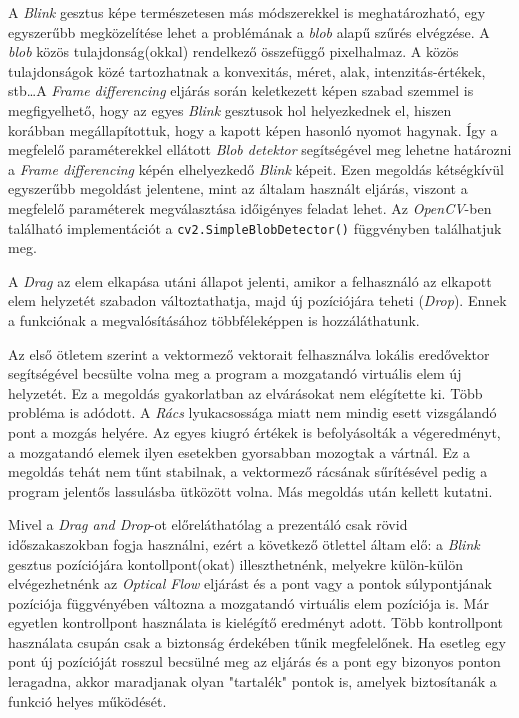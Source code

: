A \textit{Blink} gesztus képe természetesen más módszerekkel is meghatározható, egy egyszerűbb megközelítése lehet a problémának a \textit{blob} alapű szűrés elvégzése. A \textit{blob} közös tulajdonság(okkal) rendelkező összefüggő pixelhalmaz. A közös tulajdonságok közé tartozhatnak a konvexitás, méret, alak, intenzitás-értékek, stb\ldots A \textit{Frame differencing} eljárás során keletkezett képen szabad szemmel is megfigyelhető, hogy az egyes \textit{Blink} gesztusok hol helyezkednek el, hiszen korábban megállapítottuk, hogy a kapott képen hasonló nyomot hagynak. Így a megfelelő paraméterekkel ellátott \textit{Blob detektor} segítségével meg lehetne határozni a \textit{Frame differencing} képén elhelyezkedő \textit{Blink} képeit. Ezen megoldás kétségkívül egyszerűbb megoldást jelentene, mint az általam használt eljárás, viszont a megfelelő paraméterek megválasztása időigényes feladat lehet. Az \textit{OpenCV}-ben található implementációt a \texttt{cv2.SimpleBlobDetector()} függvényben találhatjuk meg.


A \textit{Drag} az elem elkapása utáni állapot jelenti, amikor a felhasználó az elkapott elem helyzetét szabadon változtathatja, majd új pozíciójára teheti (\textit{Drop}). Ennek a funkciónak a megvalósításához többféleképpen is hozzáláthatunk.

Az első ötletem szerint a vektormező vektorait felhasználva lokális eredővektor segítségével becsülte volna meg a program a mozgatandó virtuális elem új helyzetét. Ez a megoldás gyakorlatban az elvárásokat nem elégítette ki. Több probléma is adódott. A \textit{Rács} lyukacsossága miatt nem mindig esett vizsgálandó pont a mozgás helyére. Az egyes kiugró értékek is befolyásolták a végeredményt, a mozgatandó elemek ilyen esetekben gyorsabban mozogtak a vártnál. Ez a megoldás tehát nem tűnt stabilnak, a vektormező rácsának sűrítésével pedig a program jelentős lassulásba ütközött volna. Más megoldás után kellett kutatni.

Mivel a \textit{Drag and Drop}-ot előreláthatólag a prezentáló csak rövid időszakaszokban fogja használni, ezért a következő ötlettel áltam elő: a \textit{Blink} gesztus pozíciójára kontollpont(okat) illeszthetnénk, melyekre külön-külön elvégezhetnénk az \textit{Optical Flow} eljárást és a pont vagy a pontok súlypontjának pozíciója függvényében változna a mozgatandó virtuális elem pozíciója is. Már egyetlen kontrollpont használata is kielégítő eredményt adott. Több kontrollpont használata csupán csak a biztonság érdekében tűnik megfelelőnek. Ha esetleg egy pont új pozícióját rosszul becsülné meg az eljárás és a pont egy bizonyos ponton leragadna, akkor maradjanak olyan "tartalék" pontok is, amelyek biztosítanák a funkció helyes működését.

